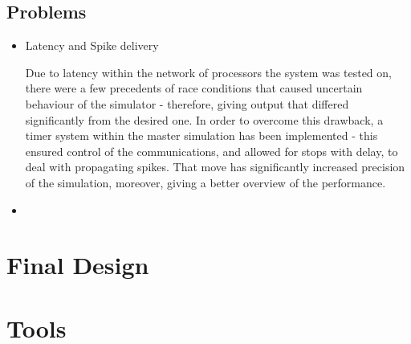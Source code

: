 \subsection{Problems}
\begin{itemize}

\item {Latency and Spike delivery}

Due to latency within the network of processors the system was tested on, there were a few precedents of race conditions that caused uncertain behaviour of the simulator - therefore, giving output that differed significantly from the desired one. In order to overcome this drawback, a timer system within the master simulation has been implemented - this ensured control of the communications, and allowed for stops with delay, to deal with propagating spikes. That move has significantly increased precision of the simulation, moreover, giving a better overview of the performance.

\item {}

\end{itemize}


\section{Final Design}

\section{Tools}
